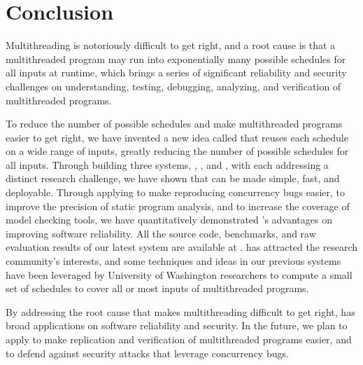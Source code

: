 \chapter{Conclusion} \label{sec:conclusion}

Multithreading is notoriously difficult to get right, and a root cause is that 
a multithreaded program may run into exponentially many
possible schedules for all inputs at runtime, which brings a series of
significant reliability and security challenges on understanding,
testing, debugging, analyzing, and verification of multithreaded
programs.

To reduce the number of possible schedules and make multithreaded
programs easier to get right, we have invented a new idea called \smt that 
reuses each schedule on a wide range of inputs,
greatly reducing the number of possible schedules for all inputs. Through
building three \smt systems, \tern, \peregrine, and \parrot, with each 
addressing
a distinct research challenge, we have shown that \smt can be made simple, fast,
and deployable. Through applying \smt to make reproducing concurrency bugs
easier, to improve the precision of static program analysis, and to increase the
coverage of model checking tools, we have quantitatively demonstrated \smt's 
advantages on improving software reliability. All the source code,
benchmarks, and raw evaluation results of our latest \smt system \parrot are
available at \github. \smt has attracted the research community's interests, 
and some techniques and ideas in our previous systems have been leveraged by 
University of Washington researchers to compute a small set of schedules to 
cover all or most inputs of multithreaded programs.

By addressing the root cause that makes multithreading difficult to get right,
\smt has broad applications on software reliability and security. In the 
future, we plan to apply \smt to make replication and verification of 
multithreaded programs easier, and to defend against security attacks 
that leverage concurrency bugs.